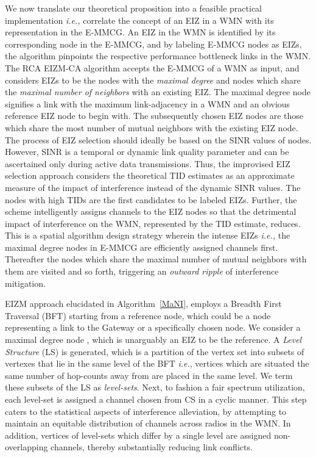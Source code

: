 \documentclass[conference]{IEEEtran}
\begin{document}
We now translate our theoretical proposition into a feasible practical implementation \emph{i.e.,} correlate the concept of an EIZ in a WMN with its representation in the E-MMCG. An EIZ in the WMN is identified by its corresponding node in the E-MMCG, and by labeling E-MMCG nodes as EIZs, the algorithm pinpoints the respective performance bottleneck links in the WMN. The RCA EIZM-CA algorithm accepts the E-MMCG of a WMN as input, and considers EIZs to be the nodes with the \textit{maximal degree} and nodes which share the \textit{maximal number of neighbors} with an existing EIZ. The maximal degree node signifies a link with the maximum link-adjacency in a WMN and an obvious reference EIZ node to begin with. The subsequently chosen EIZ nodes are those which share the most number of mutual neighbors with the existing EIZ node. The process of EIZ selection should ideally be based on the SINR values of nodes. However, SINR is a temporal or dynamic link quality parameter and can be ascertained only during active 
data transmissions. Thus, the improvised EIZ selection approach considers the theoretical TID estimates as an approximate measure of the impact of interference instead of the dynamic SINR values. The nodes with high TIDs are the first candidates to be labeled EIZs. Further, the scheme intelligently assigns channels to the EIZ nodes so that the detrimental impact of interference on the WMN, represented by the TID estimate, reduces. This is a spatial algorithm design strategy wherein the intense EIZs \emph{i.e.,} the maximal degree nodes in E-MMCG are efficiently assigned channels first. Thereafter the nodes which share the maximal number of mutual neighbors with them are visited and so forth, triggering an \textit{outward ripple} of interference mitigation.

EIZM approach elucidated in Algorithm~\ref{MaNI}, employs a Breadth First Traversal (BFT) starting from a reference node, which could be a node representing a link to the Gateway or a specifically chosen node. We consider a maximal degree node , which is unarguably an EIZ to be the reference. A \textit{Level Structure} (LS) is generated, which is a partition of the vertex set  into subsets of vertexes that lie in the same level of the BFT \emph{i.e.}, vertices which are situated the same number of hop-counts away from  are placed in the same level. We term these subsets of the LS as \textit{level-sets}. Next, to fashion a fair spectrum utilization, each level-set is assigned a channel chosen from CS  in a cyclic manner. This step caters to the statistical aspects of interference alleviation, by attempting to maintain an equitable distribution of channels across radios in the WMN. In addition, vertices of level-sets which differ by a single level are assigned non-overlapping 
channels, thereby substantially reducing link conflicts.
\end{document}
